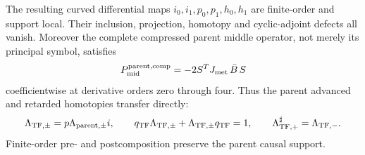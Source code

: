 \documentclass[11pt]{article}
\theoremstyle{definition}
\theoremstyle{remark}
\begin{document}
The resulting curved differential maps $i_0,i_1,p_0,p_1,h_0,h_1$ are
finite-order and support local.  Their inclusion, projection, homotopy and
cyclic-adjoint defects all vanish.  Moreover the complete compressed parent
middle operator, not merely its principal symbol, satisfies
\begin{equation}\label{eq:curved-tractor-Bach-match}
 P_{\rm mid}^{\rm parent,comp}
 =-2S^T J_{\rm met}\,\bar B\,S
\end{equation}
coefficientwise at derivative orders zero through four.  Thus the parent
advanced and retarded homotopies transfer directly:
\begin{equation}\label{eq:tractor-green-transfer}
 \Lambda_{{\rm TF},\pm}=p\Lambda_{{\rm parent},\pm}i,
 \qquad
 q_{\rm TF}\Lambda_{{\rm TF},\pm}
 +\Lambda_{{\rm TF},\pm}q_{\rm TF}=1,
 \qquad
 \Lambda_{{\rm TF},+}^{\sharp}=\Lambda_{{\rm TF},-}.
\end{equation}
Finite-order pre- and postcomposition preserve the parent causal support.
\end{document}
